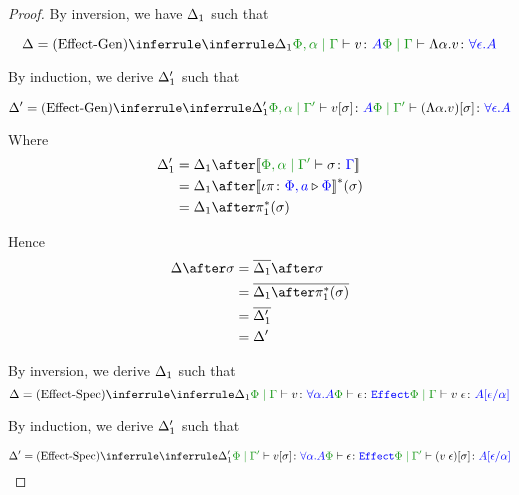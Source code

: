 \documentclass{report}
\begin{document}
\begin{framed}
\begin{proof}
        \case{\vgen}
        
        By inversion, we have $\Delta_1$ such that
        
        \begin{equation}
            \D = \ntreeruleI{\vgen}{\treeruleI{\D_1}{\etyperelation{\P,\a}{\G}{v}{A}}}{\gpetyperelation{\elam{\a}{v}}{\all{\e}{A}}}
        \end{equation}
        
        By induction, we derive $\Delta_1'$ such that
        
        \begin{equation}
            \D' = \ntreeruleI{\vgen}{\treeruleI{\D_1'}{\etyperelation{\P,\a}{\G'}{v\ssi}{A}}}{\etyperelation{\P}{\G'}{(\elam{\a}{v})\ssi}{\all{\e}{A}}}
        \end{equation}
        
        Where 
        \begin{align*}
            \D_1' & = \D_1\after\deno{\etyperelation{\P,\a}{\G'}{\si}{\G}}\\
            & = \D_1\after\deno{\wrel{\i\pi}{\P,a}{\P}}\star(\si)\\
            & = \D_1\after\pstar(\si)
        \end{align*}
        
        Hence \begin{align*}
            \D\after\si & = \bar{\D_1}\after\si\\
            & = \bar{\D_1\after\pstar(\si)}\\
            & = \bar{\D_1'}\\
            & = \D'
        \end{align*}
        
        \case{\vspec}
        By inversion, we derive $\Delta_1$ such that
        \begin{equation}
            \D = \ntreeruleII{\vspec}{\treeruleI{\D_1}{\etyperelation{\P}{\G}{v}{\all{\a}{A}}}}{\wellformede{\P}{\e}}{\etyperelation{\P}{\G}{\eapp{v}{\e}}{A\ssub{\a}{\e}}}
        \end{equation}
        
        By induction, we derive $\Delta_1'$ such that
        
        \begin{equation}
            \D' = \ntreeruleII{\vspec}{\treeruleI{\D_1'}{\etyperelation{\P}{\G'}{v\ssi}{\all{\a}{A}}}}{\wellformede{\P}{\e}}{\etyperelation{\P}{\G'}{(\eapp{v}{\e})\ssi}{A\ssub{\a}{\e}}}
        \end{equation}
        

\end{proof}
\end{framed}
\end{document}
